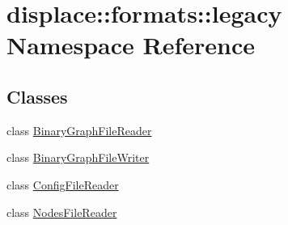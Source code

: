 \hypertarget{namespacedisplace_1_1formats_1_1legacy}{}\section{displace\+::formats\+::legacy Namespace Reference}
\label{namespacedisplace_1_1formats_1_1legacy}
\subsection*{Classes}
\begin{DoxyCompactItemize}
\item 
class \mbox{\hyperlink{classdisplace_1_1formats_1_1legacy_1_1_binary_graph_file_reader}{Binary\+Graph\+File\+Reader}}
\item 
class \mbox{\hyperlink{classdisplace_1_1formats_1_1legacy_1_1_binary_graph_file_writer}{Binary\+Graph\+File\+Writer}}
\item 
class \mbox{\hyperlink{classdisplace_1_1formats_1_1legacy_1_1_config_file_reader}{Config\+File\+Reader}}
\item 
class \mbox{\hyperlink{classdisplace_1_1formats_1_1legacy_1_1_nodes_file_reader}{Nodes\+File\+Reader}}
\end{DoxyCompactItemize}
